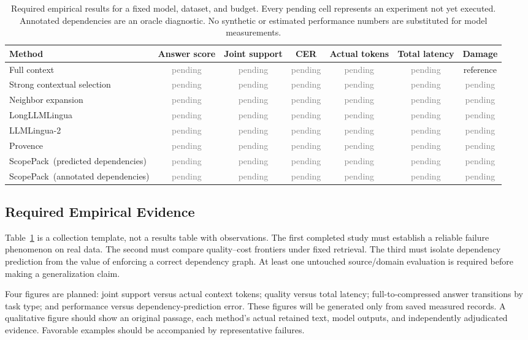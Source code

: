 \documentclass[10pt,twocolumn]{article}
\newcommand{\method}{ScopePack}
\newcommand{\pending}{\textcolor{gray}{pending}}
\begin{document}
\begin{table}[t]
\centering\small
\begin{tabular}{lcccccc}
\toprule
Method & Answer score & Joint support & CER & Actual tokens & Total latency & Damage\\
\midrule
Full context & \pending & \pending & \pending & \pending & \pending & reference\\
Strong contextual selection & \pending & \pending & \pending & \pending & \pending & \pending\\
Neighbor expansion & \pending & \pending & \pending & \pending & \pending & \pending\\
LongLLMLingua & \pending & \pending & \pending & \pending & \pending & \pending\\
LLMLingua-2 & \pending & \pending & \pending & \pending & \pending & \pending\\
Provence & \pending & \pending & \pending & \pending & \pending & \pending\\
\method\ (predicted dependencies) & \pending & \pending & \pending & \pending & \pending & \pending\\
\method\ (annotated dependencies) & \pending & \pending & \pending & \pending & \pending & \pending\\
\bottomrule
\end{tabular}
\caption{Required empirical results for a fixed model, dataset, and budget. Every pending cell represents an experiment not yet executed. Annotated dependencies are an oracle diagnostic. No synthetic or estimated performance numbers are substituted for model measurements.}
\label{tab:pending}
\end{table}

\subsection{Required Empirical Evidence}
Table~\ref{tab:pending} is a collection template, not a results table with observations. The first completed study must establish a reliable failure phenomenon on real data. The second must compare quality--cost frontiers under fixed retrieval. The third must isolate dependency prediction from the value of enforcing a correct dependency graph. At least one untouched source/domain evaluation is required before making a generalization claim.

Four figures are planned: joint support versus actual context tokens; quality versus total latency; full-to-compressed answer transitions by task type; and performance versus dependency-prediction error. These figures will be generated only from saved measured records. A qualitative figure should show an original passage, each method's actual retained text, model outputs, and independently adjudicated evidence. Favorable examples should be accompanied by representative failures.
\end{document}
